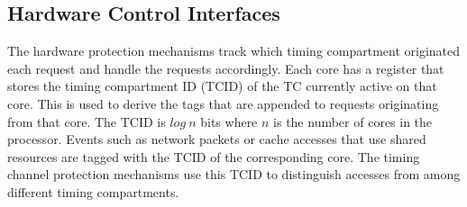 


\subsection{Hardware Control Interfaces}



The hardware protection mechanisms track which timing compartment originated 
each request and handle the requests accordingly. Each core has a register that 
stores the timing compartment ID (TCID) of the TC currently active on that core. This is used to derive 
the tags that are appended to requests originating from that core. The TCID is 
$log\ n$ bits where $n$ is the number of cores in the processor.
Events such as network packets or cache accesses that use shared resources are 
tagged with the TCID of the corresponding core. 
The timing channel protection mechanisms use this TCID to distinguish accesses
from among different timing compartments.

